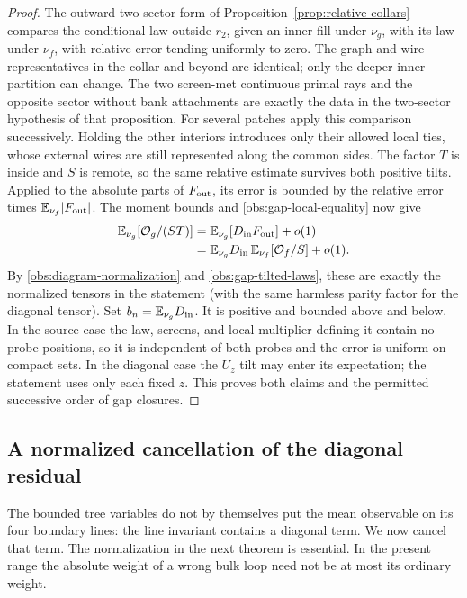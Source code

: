 \begin{proof}
The outward two-sector form of
Proposition~\ref{prop:relative-collars} compares the conditional
law outside $r_2$, given an inner fill under $\nu_g$, with its
law under $\nu_f$, with relative error tending uniformly to zero.
The graph and wire representatives in the collar and beyond
are identical; only the deeper inner partition can change.  The
two screen-met continuous primal rays and the opposite sector
without bank attachments are exactly the data in the two-sector hypothesis
of that proposition.
For several patches apply this comparison successively.  Holding
the other interiors introduces only their allowed local ties,
whose external wires are still represented along the common
sides.  The factor $T$ is inside and $S$ is remote, so the same
relative estimate survives both positive tilts.  Applied to
the absolute parts of $F_{\rm out}$, its error is bounded by
the relative error times $\mathbb E_{\nu_f}|F_{\rm out}|$.
The moment bounds and \eqref{obs:gap-local-equality} now give
\begin{align}
 \mathbb E_{\nu_g}[\mathcal O_g/(ST)]
 &=\mathbb E_{\nu_g}[D_{\rm in}F_{\rm out}]+o(1)\notag\\
 &=\mathbb E_{\nu_g}D_{\rm in}\,
       \mathbb E_{\nu_f}[\mathcal O_f/S]+o(1).
 \label{obs:normalized-gap-factorization}
\end{align}
By \eqref{obs:diagram-normalization} and
\eqref{obs:gap-tilted-laws}, these are exactly the normalized
tensors in the statement (with the same harmless parity factor
for the diagonal tensor).  Set $b_n=\mathbb E_{\nu_g}D_{\rm in}$.
It is positive and bounded above and below.  In the source case
the law, screens, and local multiplier defining it contain no
probe positions, so it is independent of both probes and the
error is uniform on compact sets.  In the diagonal case the
$U_z$ tilt may enter its expectation; the statement uses only
each fixed $z$.  This proves both claims and the permitted
successive order of gap closures.
\end{proof}

\subsection{A normalized cancellation of the diagonal residual}
\label{obs:residual-section}

The bounded tree variables do not by themselves put the mean observable
on its four boundary lines: the line invariant contains a diagonal
term.  We now cancel that term.  The normalization in the next theorem
is essential.  In the present range the absolute weight of a wrong
bulk loop need not be at most its ordinary weight.

